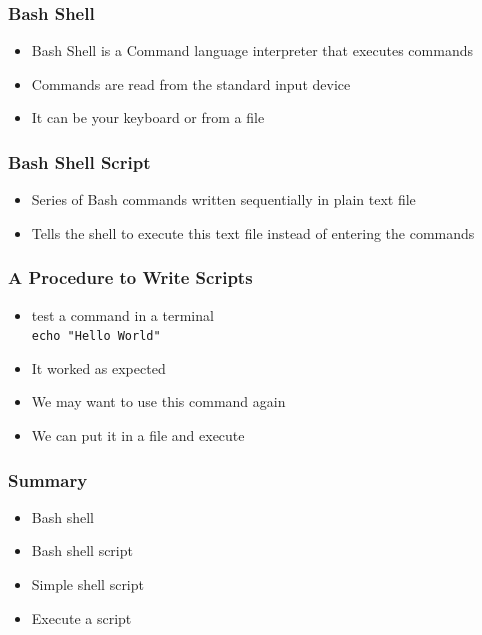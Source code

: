 \documentclass[17pt]{beamer}
\begin{document}
\begin{frame}[fragile]
  \frametitle{Bash Shell} \pause
  \begin{itemize}[<+-|alert@+>]
  \item Bash Shell is a Command language interpreter that executes commands  
  \item Commands are read from the standard input device
  \item It can be your keyboard or from a file
  \end{itemize}
\end{frame}

\begin{frame}[fragile]
  \frametitle{Bash Shell Script} \pause
  \begin{itemize}[<+-|alert@+>]
  \item Series of Bash commands written sequentially in plain text file
  \item Tells the shell to execute this text file instead of entering
    the commands
  \end{itemize}
\end{frame}

\begin{frame}
  \frametitle{A Procedure to Write Scripts} \pause
  \begin{itemize}[<+-|alert@+>]
  \item test a command in a terminal \\
    {\tt echo "Hello World"} 
  \item It worked as expected 
  \item We may want to use this command again 
  \item We can put it in a file and execute 
  \end{itemize}
\end{frame}

\begin{frame}[fragile]
  \frametitle{Summary}
  \begin{itemize}[<+-|alert@+>]
  \item Bash shell 
  \item Bash shell script 
  \item Simple shell script 
  \item Execute a script
  \end{itemize}
\end{frame}
\end{document}

